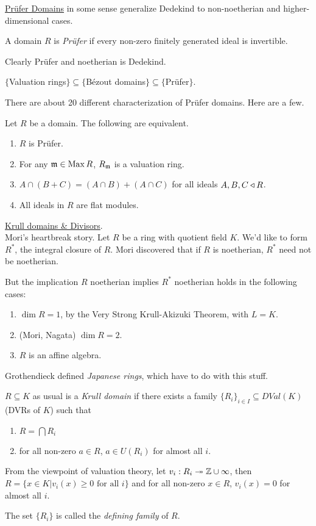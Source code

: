  \underline{Pr\"ufer Domains} in some sense generalize Dedekind to non-noetherian and
 higher-dimensional cases.
 \begin{definition}
   A domain $R$ is \emph{Pr\"ufer} if every non-zero finitely generated ideal is
   invertible.
 \end{definition}
 Clearly Pr\"ufer and noetherian is Dedekind.
 \begin{example}
   $\{$Valuation rings$\}\subseteq \{$B\'ezout
     domains$\}\subseteq\{$Pr\"ufer$\}$.
 \end{example}
 There are about 20 different characterization of Pr\"ufer domains. Here are a few.
 \begin{theorem}
   Let $R$ be a domain. The following are equivalent.
   \begin{enumerate}
     \item $R$ is Pr\"ufer.
     \item For any $\mathfrak{m}\in \operatorname{Max} R$, $R_{\mathfrak{m}}$ is a valuation ring.
     \item $A\cap (B+C)=(A\cap B)+(A\cap C)$ for all ideals $A,B,C\triangleleft R$.
     \item All ideals in $R$ are flat modules.
   \end{enumerate}
 \end{theorem}

 \underline{Krull domains \& Divisors}.\\
 Mori's heartbreak story. Let $R$ be a ring with quotient field $K$. We'd like to form
 $R^*$, the integral closure of $R$. Mori discovered that if $R$ is noetherian, $R^*$
 need not be noetherian.

 But the implication $R$ noetherian implies $R^*$ noetherian holds in the following
 cases:
 \begin{enumerate}
   \item $\dim R=1$, by the Very Strong Krull-Akizuki Theorem, with $L=K$.
   \item (Mori, Nagata) $\dim R=2$.
   \item $R$ is an affine algebra.
 \end{enumerate}
 Grothendieck defined \emph{Japanese rings}, which have to do with this stuff.
 \begin{definition}
   $R\subseteq K$ as usual is a \emph{Krull domain} if there exists a family
   $\{R_i\}_{i\in I}\subseteq DVal(K)$ (DVRs of $K$) such that
   \begin{enumerate}
     \item $R = \bigcap R_i$
     \item for all non-zero $a\in R$, $a\in U(R_i)$ for almost all $i$.
   \end{enumerate}
 \end{definition}
 From the viewpoint of valuation theory, let $v_i:R_i\twoheadrightarrow \mathbb{Z}\cup \infty$,
 then $R=\{x\in K|v_i(x)\ge 0 \text{ for all }i\}$ and for all non-zero $x\in R$,
 $v_i(x)=0$ for almost all $i$.

 The set $\{R_i\}$ is called the \emph{defining family} of $R$.
